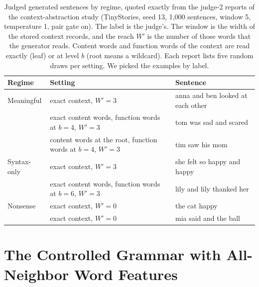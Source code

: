 \documentclass[11pt,letterpaper]{article}
\begin{document}
\begin{table}[h]
\caption{Judged generated sentences by regime, quoted exactly from the judge-2 reports of the context-abstraction study (TinyStories, seed 13, 1,000 sentences, window 5, temperature 1, pair gate on). The label is the judge's.
The window is the width of the stored context records, and the reach $W'$ is the number of those words that the generator reads. Content words and function words of the context are read exactly (leaf) or at level $b$ (root means a wildcard).
Each report lists five random draws per setting. We picked the examples by label.}
\label{tab:showcase}
\begin{center}
\footnotesize
\begin{tabular}{lp{}p{}}
\toprule
Regime & Setting & Sentence \\
\midrule
Meaningful & exact context, $W'=3$ & anna and ben looked at each other \\
 & exact content words, function words at $b=4$, $W'=3$ & tom was sad and scared \\
 & content words at the root, function words at $b=4$, $W'=3$ & tim saw his mom \\
Syntax-only & exact context, $W'=3$ & she felt so happy and happy \\
 & exact content words, function words at $b=6$, $W'=3$ & lily and lily thanked her \\
Nonsense & exact context, $W'=0$ & the cat happy \\
 & exact context, $W'=0$ & mia said and the ball \\
\bottomrule
\end{tabular}
\end{center}
\end{table}


\section{The Controlled Grammar with All-Neighbor Word Features}
\end{document}
